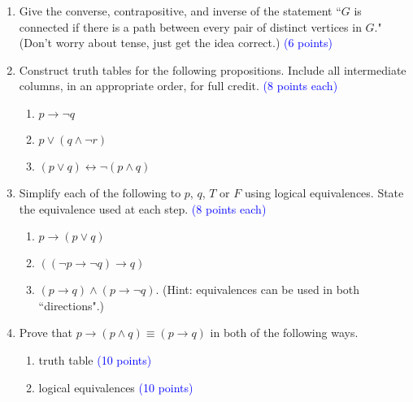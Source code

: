 \documentclass{article}
\newcommand{\pt}[1]{\textcolor{blue}{(#1 points)}}
\newcommand{\pte}[1]{\textcolor{blue}{(#1 points each)}}
\begin{document}
\begin{enumerate}
    \item Give the converse, contrapositive, and inverse of the statement ``$G$ is connected if there is a path between every pair of distinct vertices in $G$." (Don't worry about tense, just get the idea correct.) \pt 6
    
    \item Construct truth tables for the following propositions. Include all intermediate columns, in an appropriate order, for full credit. \pte 8
    \begin{enumerate}
        \item $p \rightarrow \lnot q$
        \item $p \lor (q \wedge \lnot r)$
        \item $(p \lor q) \leftrightarrow \lnot (p \wedge q)$
    \end{enumerate}
    
    \item Simplify each of the following to $p$, $q$, $T$ or $F$ using logical equivalences. State the equivalence used at each step. \pte 8
    \begin{enumerate}
        \item $p \rightarrow (p \lor q)$
        \item $((\lnot p \rightarrow \lnot q) \rightarrow q)$
        \item $(p \rightarrow q) \wedge (p \rightarrow \lnot q)$. (Hint: equivalences can be used in both ``directions".)
    \end{enumerate}
    
    \item Prove that $p\rightarrow(p\wedge q) \equiv (p \rightarrow q)$ in both of the following ways.
    \begin{enumerate}
        \item truth table \pt{10}
        \item logical equivalences \pt{10}
    \end{enumerate}
    
\end{enumerate}
\end{document}

